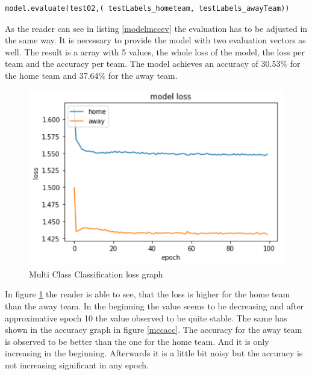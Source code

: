 \begin{lstlisting}[language=Python, caption=Python code for multi class classification model evaluation, label=modelmccev]
model.evaluate(test02,( testLabels_hometeam, testLabels_awayTeam))
\end{lstlisting}

As the reader can see in listing \ref{modelmccev} the evaluation has to be adjusted in the same way. It is necessary to provide the model with two evaluation vectors as well. The result is a array with 5 values, the whole loss of the model, the loss per team and the accuracy per team. The model achieves an accuracy of 30.53\% for the home team and 37.64\% for the away team. 

\begin{figure}[H]
\begin{center}
\includegraphics[scale=1.5]{images/mccloss.PNG}
\end{center}
\caption{Multi Class Classification loss graph}
\label{mccloss}
\end{figure}

In figure \ref{mccloss} the reader is able to see, that the loss is higher for the home team than the away team. In the beginning the value seems to be decreasing and after approximative epoch 10 the value observed to be quite stable. The same has shown in the accuracy graph in figure \ref{mccacc}. The accuracy for the away team is observed to be better than the one for the home team. And it is only increasing in the beginning. Afterwards it is a little bit noisy but the accuracy is not increasing significant in any epoch. 

